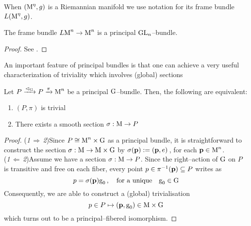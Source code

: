 \begin{note}
    When $(\text{\normalfont M}^\eta,g)$ is a Riemannian manifold we use notation for its frame bundle $L(\text{\normalfont M}^\eta,g)$.
\end{note}

\begin{prop}
    The frame bundle $L\text{\normalfont M}^n\to\text{\normalfont M}^n$ is a principal $\text{\normalfont GL}_n$--bundle.
\end{prop}
\begin{proof}
    See \cite{princ1}.%
\end{proof}


An important feature of principal bundles is that one can achieve a very useful characterization of triviality which involves (global) sections

\begin{teo}
    Let $P\xrightarrow{\vartriangleleft_{\text{\normalfont G}}}P\xrightarrow[]{\pi}\text{\normalfont M}^n$ be a principal $\text{\normalfont G}$--bundle. Then, the following are equivalent:
    \begin{enumerate}
        \item $(P,\pi)$ is trivial
        \item There exists a smooth section $\sigma:\text{\normalfont M}\to P$
    \end{enumerate}
\end{teo}
\begin{proof}
    (\emph{1}$\,\Rightarrow\,$\emph{2})\quad Since $P\cong\text{\normalfont M}^n\times\text{\normalfont G}$ as a principal bundle, it is straightforward to construct the section $\sigma:\text{\normalfont M}\to\text{\normalfont M}\times\text{\normalfont G}$ by $\sigma(\mathbf{p}):=(\mathbf{p},e)\,$, for each $\mathbf{p}\in\text{\normalfont M}^n$.\\
    (\emph{1}$\,\Leftarrow\,$\emph{2})\quad Assume we have a section $\sigma:\text{\normalfont M}\to P$. Since the right--action of $\text{\normalfont G}$ on $P$ is transitive and free on each fiber, every point $p\in\pi^{-1}(\mathbf{p})\subseteq P$ writes as 
    $$p=\sigma(\mathbf{p})\text{\normalfont g}_0\,,\quad\text{for a unique}\quad\text{\normalfont g}_0\in\text{\normalfont G}$$
    Consequently, we are able to construct a (global) trivialisation
    $$p\in P\mapsto(\mathbf{p},\text{\normalfont g}_0)\in\text{\normalfont M}\times\text{\normalfont G}$$
    which turns out to be a principal--fibered isomorphism.
\end{proof}

